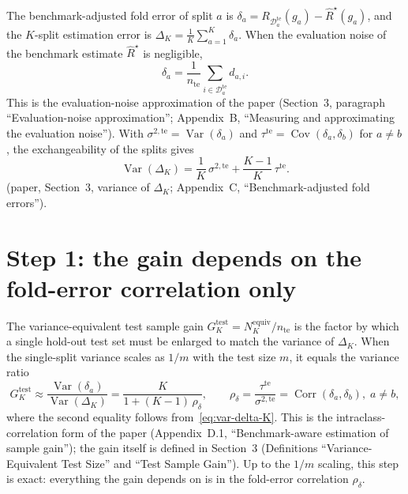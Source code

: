 \documentclass[11pt]{article}
\begin{document}
The benchmark-adjusted fold error of split $a$ is
$\delta_a = R_{\mathcal{D}^{\text{te}}_a}(g_a) - \widehat{R}^{\star}(g_a)$, and the $K$-split
estimation error is $\Delta_K = \frac{1}{K}\sum_{a=1}^K \delta_a$. When the evaluation noise
of the benchmark estimate $\widehat{R}^{\star}$ is negligible,
\begin{equation}
  \delta_a = \frac{1}{n_{\text{te}}} \sum_{i \in \mathcal{D}^{\text{te}}_a} d_{a,i}.
  \label{eq:delta-average}
\end{equation}
This is the evaluation-noise approximation of the paper (Section~3, paragraph ``Evaluation-noise
approximation''; Appendix~B, ``Measuring and approximating the evaluation noise''). With
$\sigma^{2,\mathrm{te}} = \operatorname{Var}(\delta_a)$ and
$\tau^{\mathrm{te}} = \operatorname{Cov}(\delta_a,\delta_b)$ for $a \neq b$, the exchangeability
of the splits gives
\begin{equation}
  \operatorname{Var}(\Delta_K) = \frac{1}{K}\,\sigma^{2,\mathrm{te}} + \frac{K-1}{K}\,\tau^{\mathrm{te}}.
  \label{eq:var-delta-K}
\end{equation}
(paper, Section~3, variance of $\Delta_K$; Appendix~C, ``Benchmark-adjusted fold errors'').

\section{Step 1: the gain depends on the fold-error correlation only}

The variance-equivalent test sample gain $G^{\text{test}}_K = N^{\mathrm{equiv}}_K/n_{\text{te}}$
is the factor by which a single hold-out test set must be enlarged to match the variance of
$\Delta_K$. When the single-split variance scales as $1/m$ with the test size $m$, it equals
the variance ratio
\begin{equation}
  G^{\text{test}}_K \approx \frac{\operatorname{Var}(\delta_a)}{\operatorname{Var}(\Delta_K)}
  = \frac{K}{1 + (K-1)\,\rho_\delta},
  \qquad
  \rho_\delta = \frac{\tau^{\mathrm{te}}}{\sigma^{2,\mathrm{te}}}
              = \operatorname{Corr}(\delta_a, \delta_b), \; a \neq b,
  \label{eq:gain-rho-delta}
\end{equation}
where the second equality follows from~\eqref{eq:var-delta-K}. This is the intraclass-correlation
form of the paper (Appendix~D.1, ``Benchmark-aware estimation of sample gain''); the gain itself
is defined in Section~3 (Definitions ``Variance-Equivalent Test Size'' and ``Test Sample Gain''). Up to the $1/m$ scaling, this
step is exact: everything the gain depends on is in the fold-error correlation $\rho_\delta$.
\end{document}
